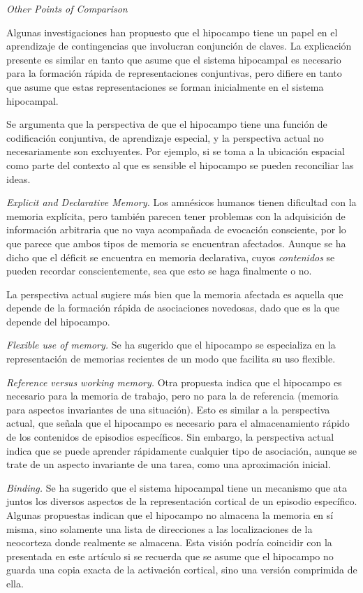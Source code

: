 \documentclass[a4paper,12pt]{article}
\begin{document}
{\itshape Other Points of Comparison}

Algunas investigaciones han propuesto que el hipocampo tiene un papel en el aprendizaje de contingencias que involucran conjunción de claves. La explicación presente es similar en tanto que asume que el sistema hipocampal es necesario para la formación rápida de representaciones conjuntivas, pero difiere en tanto que asume que estas representaciones se forman inicialmente en el sistema hipocampal. 

Se argumenta que la perspectiva de que el hipocampo tiene una función de codificación conjuntiva, de aprendizaje especial, y la perspectiva actual no necesariamente son excluyentes. Por ejemplo, si se toma a la ubicación espacial como parte del contexto al que es sensible el hipocampo se pueden reconciliar las ideas. 

{\itshape Explicit and Declarative Memory.} Los amnésicos humanos tienen dificultad con la memoria explícita, pero también parecen tener problemas con la adquisición de información arbitraria que no vaya acompañada de evocación consciente, por lo que parece que ambos tipos de memoria se encuentran afectados. Aunque se ha dicho que el déficit se encuentra en memoria declarativa, cuyos {\itshape contenidos} se pueden recordar conscientemente, sea que esto se haga finalmente o no. 

La perspectiva actual sugiere más bien que la memoria afectada es aquella que depende de la formación rápida de asociaciones novedosas, dado que es la que depende del hipocampo.

{\itshape Flexible use of memory.} Se ha sugerido que el hipocampo se especializa en la representación de memorias recientes de un modo que facilita su uso flexible. 

{\itshape Reference versus working memory.} Otra propuesta indica que el hipocampo es necesario para la memoria de trabajo, pero no para la de referencia (memoria para aspectos invariantes de una situación). Esto es similar a la perspectiva actual, que señala que el hipocampo es necesario para el almacenamiento rápido de los contenidos de episodios específicos. Sin embargo, la perspectiva actual indica que se puede aprender rápidamente cualquier tipo de asociación, aunque se trate de un aspecto invariante de una tarea, como una aproximación inicial. 

{\itshape Binding.} Se ha sugerido que el sistema hipocampal tiene un mecanismo que ata juntos los diversos aspectos de la representación cortical de un episodio específico. Algunas propuestas indican que el hipocampo no almacena la memoria en sí misma, sino solamente una lista de direcciones a las localizaciones de la neocorteza donde realmente se almacena. Esta visión podría coincidir con la presentada en este artículo si se recuerda que se asume que el hipocampo no guarda una copia exacta de la activación cortical, sino una versión comprimida de ella. 
\end{document}
